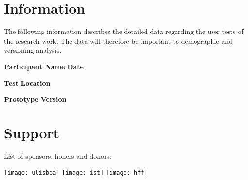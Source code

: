 
\section*{Information}

The following information describes the detailed data regarding the user tests of the research work. The data will therefore be important to demographic and versioning analysis.

\vspace{1cm}

\textbf{Participant Name} \hfill \textbf{Date}

\vspace{2.5cm}

\textbf{Test} \hfill \textbf{Location}

\vspace{2.5cm}

\textbf{Prototype} \hfill \textbf{Version}

\vfill


\section*{Support}

\hfill

List of sponsors, honers and donors:

\hfill


\hfill

\texttt{[image: ulisboa]} \hfill \texttt{[image: ist]} \hfill \texttt{[image: hff]}

\hfill

